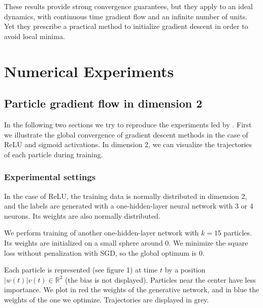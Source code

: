\documentclass[a4paper, 11pt]{scrartcl}
\begin{document}
{These results provide strong convergence guarantees, but they apply to an ideal dynamics, with continuous time gradient flow and an infinite number of units. Yet they prescribe a practical method to initialize gradient descent in order to avoid local minima.

\section{Numerical Experiments}

\subsection{Particle gradient flow in dimension 2}

In the following two sections we try to reproduce the experiments led by \cite{chizat2018global}. First we illustrate the global convergence of gradient descent methods in the case of ReLU and sigmoid activations. In dimension 2, we can visualize the trajectories of each particle during training.

\subsubsection*{Experimental settings}

In the case of ReLU, the training data is normally distributed in dimension 2, and the labels are generated with a one-hidden-layer neural network with 3 or 4 neurons. Its weights are also normally distributed.

We perform training of another one-hidden-layer network with $k=15$ particles. Its weights are initialized on a small sphere around 0. We minimize the square loss without penalization with SGD, so the global optimum is 0.

Each particle is represented (see figure 1) at time $t$ by a position $|w(t)| v(t) \in \mathbb{R}^2$ (the bias is not displayed). Particles near the center have less importance. We plot in red the weights of the generative network, and in blue the weights of the one we optimize. Trajectories are displayed in grey.\\

}
\end{document}
